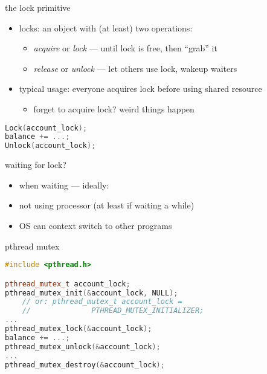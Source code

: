\begin{frame}[fragile,label=lockDefn]{the lock primitive}
    \begin{itemize}
    \item locks: an object with (at least) two operations:
        \begin{itemize}
            \item \textit{acquire} or \textit{lock} ---  until lock is free, then ``grab'' it
        \item \textit{release} or \textit{unlock} --- let others use lock, wakeup waiters
        \end{itemize}
    \item typical usage: everyone acquires lock before using shared resource
        \begin{itemize}
        \item forget to acquire lock? weird things happen
        \end{itemize}
    \end{itemize}
\begin{lstlisting}[language=C++,style=small]
Lock(account_lock);
balance += ...;
Unlock(account_lock);
\end{lstlisting}
\end{frame}

\begin{frame}{waiting for lock?}
    \begin{itemize}
    \item when waiting --- ideally:
        \vspace{.5cm}
    \item not using processor (at least if waiting a while)
    \item OS can context switch to other programs
    \end{itemize}
\end{frame}


\begin{frame}[fragile,label=pthreadMutex]{pthread mutex}
\begin{lstlisting}[language=C++,style=small]
#include <pthread.h>

pthread_mutex_t account_lock;
pthread_mutex_init(&account_lock, NULL);
    // or: pthread_mutex_t account_lock =
    //              PTHREAD_MUTEX_INITIALIZER;
...
pthread_mutex_lock(&account_lock);
balance += ...;
pthread_mutex_unlock(&account_lock);
...
pthread_mutex_destroy(&account_lock);
\end{lstlisting}
\end{frame}

